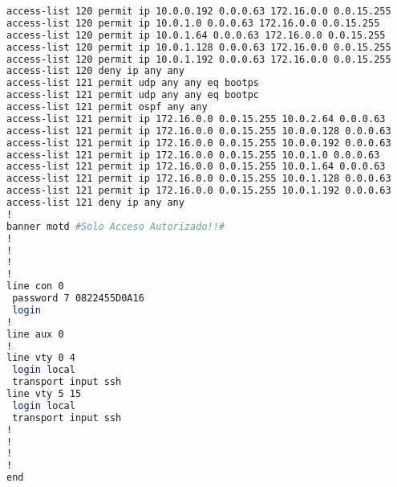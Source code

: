 \begin{lstlisting}[language=Bash, caption={Configuración Completa Switch IoMT Planta 0}]
access-list 120 permit ip 10.0.0.192 0.0.0.63 172.16.0.0 0.0.15.255
access-list 120 permit ip 10.0.1.0 0.0.0.63 172.16.0.0 0.0.15.255
access-list 120 permit ip 10.0.1.64 0.0.0.63 172.16.0.0 0.0.15.255
access-list 120 permit ip 10.0.1.128 0.0.0.63 172.16.0.0 0.0.15.255
access-list 120 permit ip 10.0.1.192 0.0.0.63 172.16.0.0 0.0.15.255
access-list 120 deny ip any any
access-list 121 permit udp any any eq bootps
access-list 121 permit udp any any eq bootpc
access-list 121 permit ospf any any
access-list 121 permit ip 172.16.0.0 0.0.15.255 10.0.2.64 0.0.0.63
access-list 121 permit ip 172.16.0.0 0.0.15.255 10.0.0.128 0.0.0.63
access-list 121 permit ip 172.16.0.0 0.0.15.255 10.0.0.192 0.0.0.63
access-list 121 permit ip 172.16.0.0 0.0.15.255 10.0.1.0 0.0.0.63
access-list 121 permit ip 172.16.0.0 0.0.15.255 10.0.1.64 0.0.0.63
access-list 121 permit ip 172.16.0.0 0.0.15.255 10.0.1.128 0.0.0.63
access-list 121 permit ip 172.16.0.0 0.0.15.255 10.0.1.192 0.0.0.63
access-list 121 deny ip any any
!
banner motd #Solo Acceso Autorizado!!#
!
!
!
!
line con 0
 password 7 0822455D0A16
 login
!
line aux 0
!
line vty 0 4
 login local
 transport input ssh
line vty 5 15
 login local
 transport input ssh
!
!
!
!
end
\end{lstlisting}
